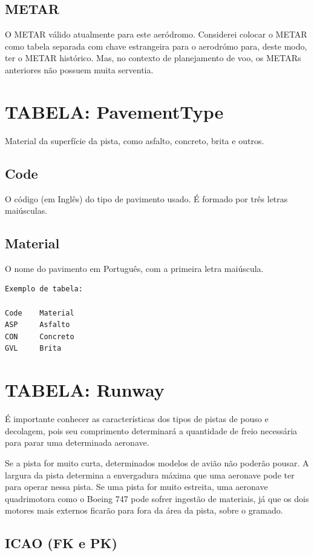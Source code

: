 \subsection{METAR}
O METAR válido atualmente para este aeródromo. Considerei colocar o METAR como tabela separada
com chave estrangeira para o aerodrómo para, deste modo, ter o METAR histórico. Mas, no 
contexto de planejamento de voo, os METARs anteriores não possuem muita serventia.

\section{TABELA: PavementType}

Material da superfície da pista, como asfalto, concreto, brita e outros.

\subsection{Code}
O código (em Inglês) do tipo de pavimento usado. É formado por três letras maiúsculas.

\subsection{Material}
O nome do pavimento em Português, com a primeira letra maiúscula.

\begin{verbatim}
Exemplo de tabela:

Code    Material
ASP     Asfalto
CON     Concreto
GVL     Brita
\end{verbatim}


\section{TABELA: Runway}

É importante conhecer as características dos tipos de pistas de 
pouso e decolagem, pois seu comprimento determinará a quantidade de freio 
necessária para parar uma determinada aeronave.

Se a pista for muito curta, determinados modelos de avião não poderão pousar. 
A largura da pista determina a envergadura máxima que uma aeronave pode ter 
para operar nessa pista. Se uma pista for muito estreita, uma aeronave quadrimotora 
como o Boeing 747 pode sofrer ingestão de materiais, já que os dois motores mais 
externos ficarão para fora da área da pista, sobre o gramado.

\subsection{ICAO (FK e PK)}

